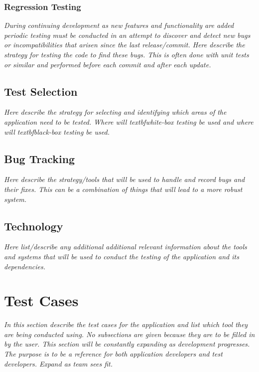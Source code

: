 \documentclass{article}
\begin{document}
\subsubsection{Regression Testing}

\textit{During continuing development as new
features and functionality are added periodic testing must be conducted in an
attempt to discover and detect new bugs or incompatibilities that arisen since
the last release/commit. Here describe the strategy for testing the code to
find these bugs. This is often done with unit tests or similar and performed
before each commit and after each update.}

\subsection{Test Selection}

\textit{Here describe the strategy for selecting and identifying which areas of
the application need to be tested. Where will textbf{white-box} testing be used
and where will textbf{black-box} testing be used.}

\subsection{Bug Tracking}

\textit{Here describe the strategy/tools that will be used
to handle and record bugs and their fixes. This can be a combination of things
that will lead to a more robust system.}

\subsection{Technology}

\textit{Here list/describe any additional additional relevant
information about the tools and systems that will be used to conduct the
testing of the application and its dependencies.}


\section{Test Cases}

\textit{In this section describe the test cases for the
application and list which tool they are being conducted using. No subsections
are given because they are to be filled in by the user. This section will be
constantly expanding as development progresses. The purpose is to be a
reference for both application developers and test developers. Expand as team
sees fit.}
\end{document}
